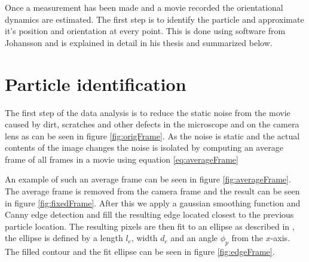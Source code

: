 Once a measurement has been made and a movie recorded the orientational dynamics are estimated. The first step is to identify the particle and approximate it's position and orientation at every point. This is done using software from Johansson \cite{AntonThesis} and is explained in detail in his thesis and summarized below.

\section{Particle identification}\label{sec:particleidentification}

The first step of the data analysis is to reduce the static noise from the movie caused by dirt, scratches and other defects in the microscope and on the camera lens as can be seen in figure \ref{fig:origFrame}. As the noise is static and the actual contents of the image changes the noise is isolated by computing an average frame of all frames in a movie using equation \ref{eq:averageFrame}

An example of such an average frame can be seen in figure \ref{fig:averageFrame}. The average frame is removed from the camera frame and the result can be seen in figure \ref{fig:fixedFrame}. After this we apply a gaussian smoothing function and Canny edge detection \cite{Canny} and fill the resulting edge located closest to the previous particle location. The resulting pixels are then fit to an ellipse as described in \cite{AntonThesis, EllipseFit}, the ellipse is defined by a length $l_e$, width $d_e$ and an angle $\phi_p$ from the $x$-axis. The filled contour and the fit ellipse can be seen in figure 
\ref{fig:edgeFrame}.

